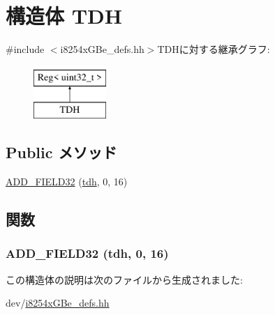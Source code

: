 \hypertarget{structiGbReg_1_1Regs_1_1TDH}{
\section{構造体 TDH}
\label{structiGbReg_1_1Regs_1_1TDH}
}


{\ttfamily \#include $<$i8254xGBe\_\-defs.hh$>$}TDHに対する継承グラフ:\begin{figure}[H]
\begin{center}
\leavevmode
\includegraphics[height=2cm]{structiGbReg_1_1Regs_1_1TDH}
\end{center}
\end{figure}
\subsection*{Public メソッド}
\begin{DoxyCompactItemize}
\item 
\hyperlink{structiGbReg_1_1Regs_1_1TDH_aaea887f74d54e107388fa784cf4a3c85}{ADD\_\-FIELD32} (\hyperlink{structiGbReg_1_1Regs_a001949adaeea4f9ae509aaeb09d87056}{tdh}, 0, 16)
\end{DoxyCompactItemize}


\subsection{関数}
\hypertarget{structiGbReg_1_1Regs_1_1TDH_aaea887f74d54e107388fa784cf4a3c85}{
\subsubsection[{ADD\_\-FIELD32}]{\setlength{\rightskip}{0pt plus 5cm}ADD\_\-FIELD32 ({\bf tdh}, \/  0, \/  16)}}
\label{structiGbReg_1_1Regs_1_1TDH_aaea887f74d54e107388fa784cf4a3c85}


この構造体の説明は次のファイルから生成されました:\begin{DoxyCompactItemize}
\item 
dev/\hyperlink{i8254xGBe__defs_8hh}{i8254xGBe\_\-defs.hh}\end{DoxyCompactItemize}
